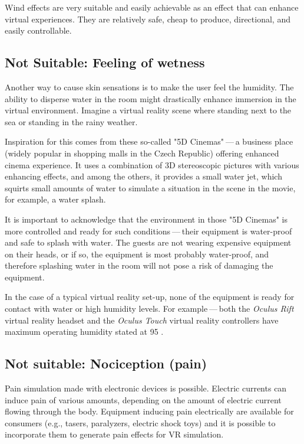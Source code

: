 Wind effects are very suitable and easily achievable as an effect that can
enhance virtual experiences. They are relatively safe, cheap to produce,
directional, and easily controllable.


\hypertarget{x-not-suitable:-feeling-of-wetness}{\subsection{Not Suitable: Feeling of wetness}}
Another way to cause skin sensations is to make the user feel the humidity.
The ability to disperse water in the room might drastically enhance immersion
in the virtual environment. Imagine a virtual reality scene where standing
next to the sea or standing in the rainy weather.


Inspiration for this comes from these so-called "5D Cinemas" — a business
place (widely popular in shopping malls in the Czech Republic) offering
enhanced cinema experience. It uses a combination of 3D stereoscopic
pictures with various enhancing effects, and among the others, it provides
a small water jet, which squirts small amounts of water to simulate a
situation in the scene in the movie, for example, a water splash. \cite{5dcin}


It is important to acknowledge that the environment in those "5D Cinemas"
is more controlled and ready for such conditions — their equipment
is water-proof and safe to splash with water. The guests are not
wearing expensive equipment on their heads, or if so, the equipment is
most probably water-proof, and therefore splashing water in the room will not
pose a risk of damaging the equipment.


In the case of a typical virtual reality set-up, none of the equipment is ready
for contact with water or high humidity levels. For example — both the
\emph{Oculus Rift} virtual reality headset and the \emph{Oculus Touch} virtual reality
controllers have maximum operating humidity stated at 95%
\cite{orhswg}.


\hypertarget{x-not-suitable:-nociception-(pain)}{\subsection{Not suitable: Nociception (pain)}}
Pain simulation made with electronic devices is possible. Electric currents can
induce pain of various amounts, depending on the amount of electric current
flowing through the body.
Equipment inducing pain electrically are available for consumers
(e.g., tasers, paralyzers, electric shock toys) and it is possible to
incorporate them to generate pain effects for VR simulation.


